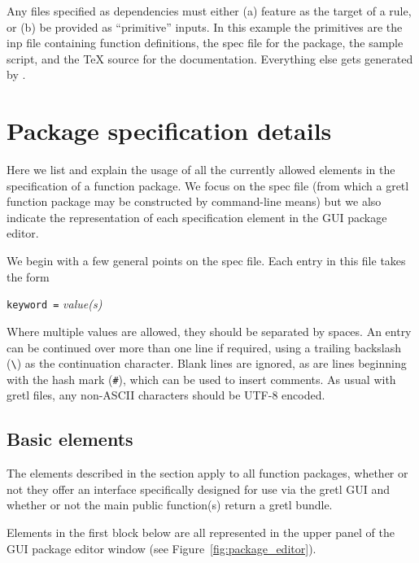 \documentclass[oneside]{book}
\begin{document}
Any files specified as dependencies must either (a) feature as the
target of a rule, or (b) be provided as ``primitive'' inputs. In this
example the primitives are the \textsf{inp} file containing function
definitions, the \textsf{spec} file for the package, the sample
script, and the \TeX{} source for the documentation. Everything else
gets generated by .

\chapter{Package specification details}
\label{chap:specfile}

Here we list and explain the usage of all the currently allowed
elements in the specification of a function package. We focus on the
\textsf{spec} file (from which a gretl function package may be
constructed by command-line means) but we also indicate the
representation of each specification element in the GUI package
editor.

We begin with a few general points on the \textsf{spec} file. Each
entry in this file takes the form

\texttt{keyword =} \textsl{value(s)}

Where multiple values are allowed, they should be separated by
spaces. An entry can be continued over more than one line if required,
using a trailing backslash (\verb+\+) as the continuation
character. Blank lines are ignored, as are lines beginning with the
hash mark (\texttt{\#}), which can be used to insert comments.  As
usual with gretl files, any non-ASCII characters should be UTF-8
encoded.

\section{Basic elements}
\label{sec:spec-basic}

The elements described in the section apply to all function packages,
whether or not they offer an interface specifically designed for
use via the gretl GUI and whether or not the main public function(s)
return a gretl bundle.

Elements in the first block below are all represented in the upper
panel of the GUI package editor window (see
Figure~\ref{fig:package_editor}).
\end{document}
